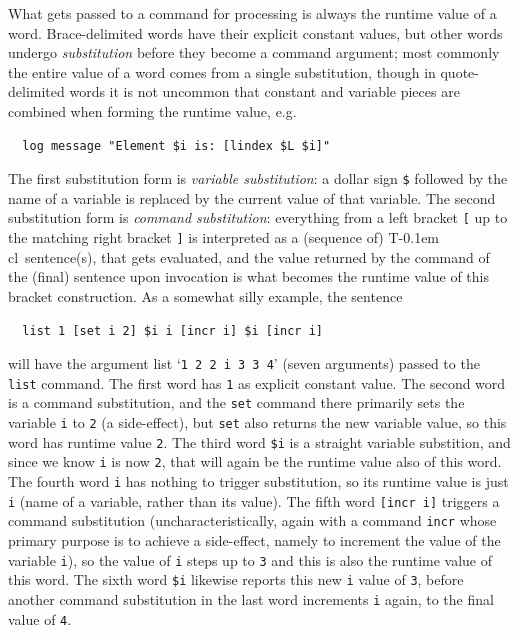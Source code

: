 \documentclass{article}
\theoremstyle{definition}
\newcommand{\Tcl}{T\kern-0.1em cl}
\begin{document}
What gets passed to a command for processing is always the runtime 
value of a word. Brace-delimited words have their explicit constant 
values, but other words undergo \emph{substitution} before they 
become a command argument; most commonly the entire value of a word 
comes from a single substitution, though in quote-delimited words it 
is not uncommon that constant and variable pieces are combined when 
forming the runtime value, e.g.
\begin{verbatim}
  log message "Element $i is: [lindex $L $i]"
\end{verbatim}
The first substitution form is 
\emph{variable substitution}: a dollar sign \verb|$| followed by the 
name of a variable is replaced by the current value of that variable. 
The second substitution form is \emph{command substitution}: 
everything from a left bracket \verb|[| up to the matching right 
bracket \verb|]| is interpreted as a (sequence of) \Tcl\ sentence(s), 
that gets evaluated, and the value returned by the command of the 
(final) sentence upon invocation is what becomes the runtime value of 
this bracket construction. As a somewhat silly example, the sentence
\begin{verbatim}
  list 1 [set i 2] $i i [incr i] $i [incr i]
\end{verbatim}
will have the argument list `\texttt{1 2 2 i 3 3 4}' (seven 
arguments) passed to the \texttt{list} command. The first word has 
\texttt{1} as explicit constant value. The second word is a command 
substitution, and the \texttt{set} command there primarily sets the 
variable \texttt{i} to \texttt{2} (a side-effect), but \texttt{set} 
also returns the new variable value, so this word has runtime value 
\texttt{2}. The third word \verb|$i| is a straight variable 
substition, and since we know \texttt{i} is now \texttt{2}, that will 
again be the runtime value also of this word. The fourth word 
\texttt{i} has nothing to trigger substitution, so its runtime value 
is just \texttt{i} (name of a variable, rather than its value). The 
fifth word \texttt{[incr~i]} triggers a command substitution 
(uncharacteristically, again with a command \texttt{incr} whose 
primary purpose is to achieve a side-effect, namely to increment the 
value of the variable \texttt{i}), so the value of \texttt{i} steps 
up to \texttt{3} and this is also the runtime value of this word. The 
sixth word \verb|$i| likewise reports this new \texttt{i} value of 
\texttt{3}, before another command substitution in the last word 
increments \texttt{i} again, to the final value of \texttt{4}.
\end{document}
